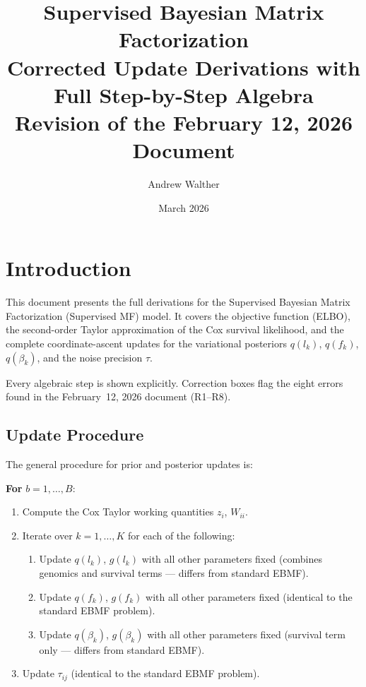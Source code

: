 \documentclass[11pt]{article}
\title{\textbf{Supervised Bayesian Matrix Factorization}\\
       \large Corrected Update Derivations with Full Step-by-Step Algebra\\[4pt]
       \normalsize Revision of the February 12, 2026 Document}
\author{Andrew Walther}
\date{March 2026}
\begin{document}
\maketitle
\tableofcontents
\newpage

\section{Introduction}

This document presents the full derivations for the Supervised Bayesian Matrix
Factorization (Supervised MF) model. It covers the objective function
(ELBO), the second-order Taylor approximation of the Cox survival likelihood,
and the complete coordinate-ascent updates for the variational posteriors
$q(l_k)$, $q(f_k)$, $q(\beta_k)$, and the noise precision $\tau$.

Every algebraic step is shown explicitly.  Correction boxes flag the eight
errors found in the February~12, 2026 document (R1--R8).

\subsection{Update Procedure}

The general procedure for prior and posterior updates is:

\textbf{For} $b = 1, \ldots, B$:
\begin{enumerate}
  \item Compute the Cox Taylor working quantities $z_i$, $W_{ii}$.
  \item Iterate over $k = 1, \ldots, K$ for each of the following:
  \begin{enumerate}
    \item Update $q(l_k)$, $g(l_k)$ with all other parameters fixed
          (combines genomics and survival terms --- differs from standard EBMF).
    \item Update $q(f_k)$, $g(f_k)$ with all other parameters fixed
          (identical to the standard EBMF problem).
    \item Update $q(\beta_k)$, $g(\beta_k)$ with all other parameters fixed
          (survival term only --- differs from standard EBMF).
  \end{enumerate}
  \item Update $\tau_{ij}$ (identical to the standard EBMF problem).
\end{enumerate}
\end{document}
